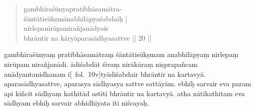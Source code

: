 \documentclass[12pt]{article}
\begin{document}
% 
% 

\begin{quote}
	gambhīraśūnyapratibhāsamātra-\footnoteB{
		°mātra°] \EDD ; mātraṃ \MS
	}\\
	śāntāti\footnoteB{
		śāntāti] \EDD ; sāntādi \MS
	}sūkṣmānabhilāpyaśabdaiḥ |\\
	nirlepanīrūpa\footnoteB{
		nirlepanīrūpa°] \EDD\ (\emd) ; nirlepanīpa \MS
	}nirañjanādyair \\
	bhrāntir na kāryāparasādhyasattve || 20 ||
% 
\end{quote}

\noindent [\EDD\ p.\ 149] gambhīraśūnyaṃ pratibhāsamātraṃ śāntātisūkṣmam anabhilāpyaṃ nirlepaṃ nīrūpam\footnoteB{
	nīrūpam] \EDD\ (\emd); nirupamaṃ \MS
} nirañjanādi.\footnoteB{
	nirañjanādi] \MS ; nirañjanaṃ \EDD
} ādiśabdāt śivaṃ nirākāraṃ niṣprapañcam anādyantanidhanam i[\MS\ fol.\ 10v]tyādiśabdair bhrāntir na kartavyā. aparasādhyasattve, aparasya sādhyasya sattve sattāyām.\footnoteB{
	sattāyām] \MS ; sattvāyā \EDD
} ebhiḥ sarvair eva param api kiñcit sādhyaṃ kathitād astīti bhrāntir na kartavyā. atha nātikathitam eva sādhyam ebhiḥ sarvair abhidhīyata iti niścayaḥ.
\end{document}

